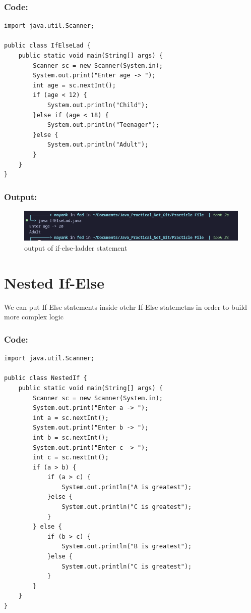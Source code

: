\documentclass[a4paper,12pt]{article}
\begin{document}
\subsubsection{Code: }
\begin{lstlisting}
import java.util.Scanner;

public class IfElseLad {
    public static void main(String[] args) {
        Scanner sc = new Scanner(System.in);
        System.out.print("Enter age -> ");
        int age = sc.nextInt();
        if (age < 12) {
            System.out.println("Child"); 
        }else if (age < 18) {
            System.out.println("Teenager"); 
        }else {
            System.out.println("Adult");
        }
    }
}
\end{lstlisting}
\subsubsection{Output: }
\begin{figure}[H]
    \centering
    \includegraphics[width=0.9\linewidth]{images/IfElseLad.png}
    \caption{output of if-else-ladder statement}
    \label{fig:sample_image}
\end{figure}

\section{Nested If-Else}
We can put If-Else statements inside otehr If-Else statemetns in order to build more
complex logic
\subsubsection{Code: }
\begin{lstlisting}
import java.util.Scanner;

public class NestedIf {
    public static void main(String[] args) {
        Scanner sc = new Scanner(System.in);
        System.out.print("Enter a -> ");
        int a = sc.nextInt();
        System.out.print("Enter b -> ");
        int b = sc.nextInt();
        System.out.print("Enter c -> ");
        int c = sc.nextInt();
        if (a > b) {
            if (a > c) {
                System.out.println("A is greatest"); 
            }else {
                System.out.println("C is greatest");
            }
        } else {
            if (b > c) {
                System.out.println("B is greatest"); 
            }else {
                System.out.println("C is greatest");
            }
        }
    }
}    
\end{lstlisting}
\end{document}
